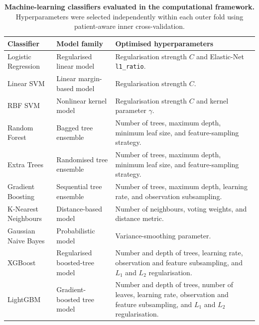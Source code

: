 \documentclass[12pt,twocolumn]{article}
\begin{document}
\begin{table}[htbp]
\centering
\caption{\textbf{Machine-learning classifiers evaluated in the
computational framework.} Hyperparameters were selected independently
within each outer fold using patient-aware inner cross-validation.}
\label{tab:classifiers}
\small
\begin{tabular}{p{3.1cm} p{3.6cm} p{9.0cm}}
\toprule
\textbf{Classifier} &
\textbf{Model family} &
\textbf{Optimised hyperparameters} \\
\midrule

Logistic Regression &
Regularised linear model &
Regularisation strength \(C\) and Elastic-Net
\texttt{l1\_ratio}. \\

Linear SVM &
Linear margin-based model &
Regularisation strength \(C\). \\

RBF SVM &
Nonlinear kernel model &
Regularisation strength \(C\) and kernel parameter \(\gamma\). \\

Random Forest &
Bagged tree ensemble &
Number of trees, maximum depth, minimum leaf size, and feature-sampling
strategy. \\

Extra Trees &
Randomised tree ensemble &
Number of trees, maximum depth, minimum leaf size, and feature-sampling
strategy. \\

Gradient Boosting &
Sequential tree ensemble &
Number of trees, maximum depth, learning rate, and observation
subsampling. \\

K-Nearest Neighbours &
Distance-based model &
Number of neighbours, voting weights, and distance metric. \\

Gaussian Naive Bayes &
Probabilistic model &
Variance-smoothing parameter. \\

XGBoost &
Regularised boosted-tree model &
Number and depth of trees, learning rate, observation and feature
subsampling, and \(L_1\) and \(L_2\) regularisation. \\

LightGBM &
Gradient-boosted tree model &
Number and depth of trees, number of leaves, learning rate, observation
and feature subsampling, and \(L_1\) and \(L_2\) regularisation. \\

\bottomrule
\end{tabular}
\end{table}
\end{document}
